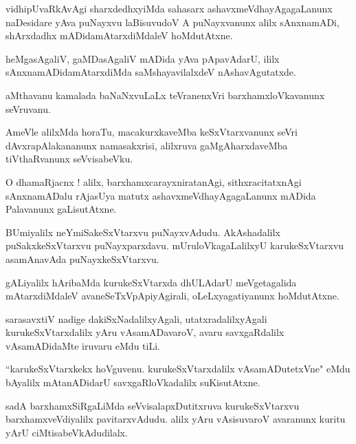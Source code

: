 \documentclass{article}
\begin{document}
\begin{mn}
vidhipUvaRkAvAgi sharxdedhxyiMda sahasarx ashavxmeVdhayAgagaLanunx naDesidare yAva puNayxvu 
laBisuvudoV A puNayxvanunx alilx sAnxnamADi, shArxdadhx mADidamAtarxdiMdaleV hoMdutAtxne.
\end{mn}

\begin{mn}
heMgasAgaliV, gaMDasAgaliV mADida yAva pApavAdarU, ililx sAnxnamADidamAtarxdiMda saMshayavilalxdeV
nAshavAgutatxde.
\end{mn}

\begin{mn}
aMthavanu kamalada baNaNxvuLaLx teVranenxVri barxhamxloVkavanunx seVruvanu.
\end{mn}

\begin{mn}
AmeVle alilxMda horaTu, macakurxkaveMba keSxVtarxvanunx seVri dAvxrapAlakananunx namasakxrisi,
alilxruva gaMgAharxdaveMba tiVthaRvanunx seVvisabeVku.
\end{mn}

\begin{mn}
O dhamaRjacnx ! alilx, barxhamxcarayxniratanAgi, sithxracitatxnAgi sAnxnamADalu rAjasUya matutx 
ashavxmeVdhayAgagaLanunx mADida Palavanunx gaLisutAtxne.
\end{mn}

\begin{mn}
BUmiyalilx neYmiSakeSxVtarxvu puNayxvAdudu. AkAshadalilx puSakxkeSxVtarxvu puNayxparxdavu. 
mUruloVkagaLalilxyU karukeSxVtarxvu asamAnavAda puNayxkeSxVtarxvu.
\end{mn}

\begin{mn}
gALiyalilx hAribaMda kurukeSxVtarxda dhULAdarU meVgetagalida mAtarxdiMdaleV 
avaneSeTxVpApiyAgirali, oLeLxyagatiyanunx hoMdutAtxne.
\end{mn}

\begin{mn}
sarasavxtiV nadige dakiSxNadalilxyAgali, utatxradalilxyAgali kurukeSxVtarxdalilx yAru vAsamADavaroV,
avaru savxgaRdalilx vAsamADidaMte iruvaru eMdu tiLi.
\end{mn}

\begin{mn}
``karukeSxVtarxkekx hoVguvenu. kurukeSxVtarxdalilx vAsamADutetxVne" eMdu bAyalilx mAtanADidarU 
savxgaRloVkadalilx suKisutAtxne.
\end{mn}

\begin{mn}
sadA barxhamxSiRgaLiMda seVvisalapxDutitxruva kurukeSxVtarxvu barxhamxveVdiyalilx pavitarxvAdudu. 
alilx yAru vAsisuvaroV avaranunx kuritu yArU ciMtisabeVkAdudilalx.
\end{mn}
\end{document}
